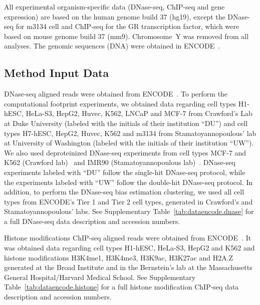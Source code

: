 All experimental organism-specific data (DNase-seq, ChIP-seq and gene expression) are based on the human genome build 37 (hg19), except the DNase-seq for m3134 cell and ChIP-seq for the GR transcription factor, which were based on mouse genome build 37 (mm9). Chromosome~Y was removed from all analyses. The genomic sequences (DNA) were obtained in ENCODE~\cite{encode2012}.

\subsection{Method Input Data}
\label{sec:method.input.data}

DNase-seq aligned reads were obtained from ENCODE~\cite{encode2012}. To perform the computational footprint experiments, we obtained data regarding cell types H1-hESC, HeLa-S3, HepG2, Huvec, K562, LNCaP and MCF-7 from Crawford's Lab at Duke University (labeled with the initials of their institution ``DU'') and cell types H7-hESC, HepG2, Huvec, K562 and m3134 from Stamatoyannopoulous' lab at University of Washington (labeled with the initials of their institution ``UW''). We also used deproteinized DNase-seq experiments from cell types MCF-7 and K562 (Crawford lab)~\cite{yardimci2014} and IMR90 (Stamatoyannopoulous lab)~\cite{lazarovici2013}. DNase-seq experiments labeled with ``DU'' follow the single-hit DNase-seq protocol, while the experiments labeled with ``UW'' follow the double-hit DNase-seq protocol. In addition, to perform the DNase-seq bias estimation clustering, we used all cell types from ENCODE's Tier 1 and Tier 2 cell types, generated in Crawford's and Stamatoyannopoulous' labs. See Supplementary Table~\ref{tab:dataencode.dnase} for a full DNase-seq data description and accession numbers.

Histone modifications ChIP-seq aligned reads were obtained from ENCODE~\cite{encode2012}. It was obtained data regarding cell types H1-hESC, HeLa-S3, HepG2 and K562 and histone modifications H3K4me1, H3K4me3, H3K9ac, H3K27ac and H2A.Z generated at the Broad Institute and in the Bernstein's lab at the Massachusetts General Hospital/Harvard Medical School. See Supplementary Table~\ref{tab:dataencode.histone} for a full histone modification ChIP-seq data description and accession numbers.

